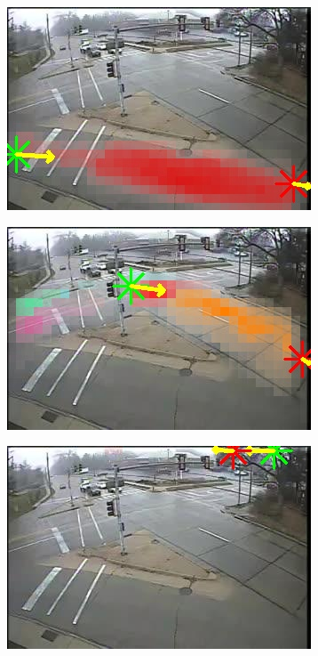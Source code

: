 \begin{figure}
    \centering
        \begin{subfigure}{0.32\linewidth}
            \includegraphics[width=\linewidth]{./img/scene_learning/res/243653/243653_h264_0-0.jpg}
        \end{subfigure}
        \begin{subfigure}{0.32\linewidth}
            \includegraphics[width=\linewidth]{./img/scene_learning/res/243653/243653_h264_0-1.jpg}
        \end{subfigure}
        \begin{subfigure}{0.32\linewidth}
            \includegraphics[width=\linewidth]{./img/scene_learning/res/243653/243653_h264_0-2.jpg}

\end{subfigure}
\end{figure}

